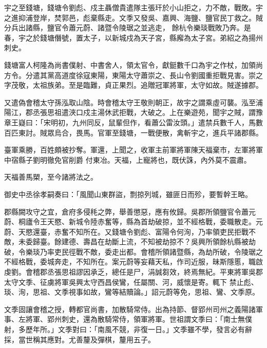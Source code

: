 \begin{pinyinscope}
 宇之至錢塘，錢塘令劉彪、戍主聶僧貴遣隊主張玕於小山拒之，力不敵，戰敗。宇之進抑浦登岸，焚郭邑，彪棄縣走。文季又發吳、嘉興、海鹽、鹽官民丁救之。賊分兵出諸縣，鹽官令蕭元蔚、諸暨令陵琚之並逃走，
 餘杭令樂琰戰敗乃奔。是春，宇之於錢塘僭號，置太子，以新城戍為天子宮，縣廨為太子宮。弟紹之為揚州刺史。



 錢塘富人柯隆為尚書僕射、中書舍人，領太官令，獻鋌數千口為宇之作杖，加領尚方令。分遣其黨高道度徐寇東陽，東陽太守蕭崇之、長山令劉國重拒戰見害。崇之字茂敬，太祖族弟。至是臨難，貞正果烈。追贈冠軍將軍，太守如故。賊遂據郡。



 又遣偽會稽太守孫泓取山陰。時會稽太守王敬則朝正，故宇之謂乘虛可襲。泓至浦陽江，郡丞張思祖遣浹口戍主湯休武拒戰，大破之。上在樂遊苑，聞宇之賊，謂豫章王嶷曰：「宋明初，九州同反，鼠輩但作，看蕭公雷汝頭。」遣禁兵數千人，馬數百匹東討。賊眾烏合，畏馬。官軍至錢塘，一戰便散，禽斬宇之，進兵平諸郡縣。



 臺軍乘勝，百姓頗被抄奪。軍還，上聞之，收軍主前軍將軍陳天福棄市，左軍將軍中宿縣子劉明徹免官削爵
 付東冶。天福，上寵將也，既伏誅，內外莫不震肅。



 天福善馬槊，至今諸將法之。



 御史中丞徐孝嗣奏曰：「風聞山東群盜，剽掠列城，雖匪日而殄，要暫幹王略。



 郡縣闕攻守之宜，倉府多侵秏之弊，舉善懲惡，應有攸歸。吳郡所領鹽官令蕭元蔚、桐廬令王天愍、新城令陸赤奮等，縣為首劫破掠，並不經格戰，委職散走。元蔚、天愍還臺，赤奮不知所在。又錢塘令劉彪、富陽令何洵，乃率領吏民拒戰不敵，未委歸臺。餘建德、壽昌在劫斷上流，不知被劫掠不？吳興所領餘杭縣被劫破，令樂琰乃率吏民徑戰不敵，委走出都。會稽所領諸暨縣，為劫所破，令陵琚之不經格戰，委城奔走，不知所在。案元蔚等妄藉天私，作司近服，昧斯隱慝，職啟虔劉。會稽郡丞張思祖謬因承乏，總任是尸，涓誠芻效，終焉無紀。平東將軍吳郡太守文季、征虜將軍吳興太守西昌侯鸞，任屬關、河，威懷是寄。輒下
 禁止彪、琰、洵，思祖、文季視事如故，鸞等結贖論。」詔元蔚等免，思祖、鸞、文季原。



 文季固讓會稽之授，轉都官尚書，加散騎常侍。出為持節、督郢州司州之義陽諸軍事、左將軍、郢州刺史，還為散騎常侍，領軍將軍。世祖謂文季曰：「南士無僕射，多歷年所。」文季對曰：「南風不競，非復一日。」文季雖不學，發言必有辭採，當世稱其應對。尤善釐及彈棋，釐用五子。




\end{pinyinscope}
